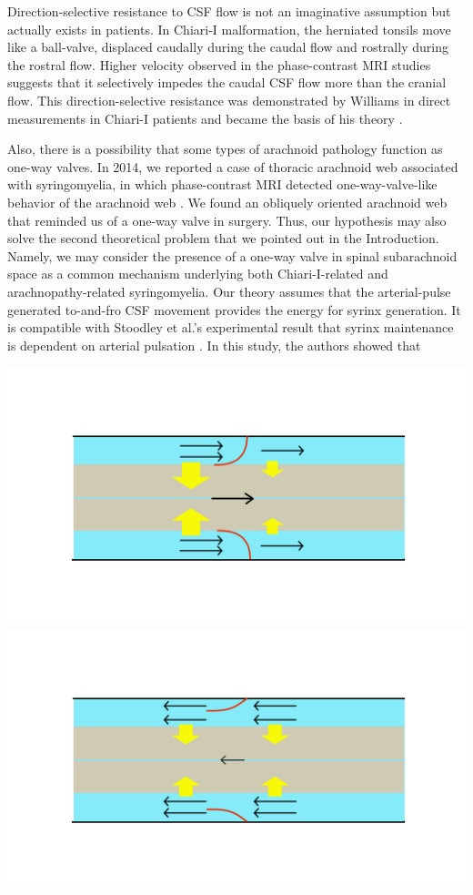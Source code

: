 \documentclass[fleqn,10pt]{wlscirep}
\begin{document}
Direction-selective resistance to CSF flow is not an imaginative assumption
but actually exists in patients. In Chiari-I malformation, the herniated
tonsils move like a ball-valve, displaced caudally during the caudal flow
and rostrally during the rostral flow. Higher velocity observed in the
phase-contrast MRI studies suggests that it selectively impedes the caudal
CSF flow more than the cranial flow. This direction-selective resistance
was demonstrated by Williams in direct measurements in Chiari-I patients
and became the basis of his theory \cite{williams1981simultaneous}.

Also, there is a possibility that some types of arachnoid pathology
function as one-way valves. In 2014, we reported a case of thoracic
arachnoid web associated with syringomyelia, in which phase-contrast MRI
detected one-way-valve-like behavior of the arachnoid web
\cite{chang2014dorsal}. We found an obliquely oriented arachnoid web that
reminded us of a one-way valve in surgery. Thus, our hypothesis may also
solve the second theoretical problem that we pointed out in the
Introduction. Namely, we may consider the presence of a one-way valve in
spinal subarachnoid space as a common mechanism underlying both
Chiari-I-related and arachnopathy-related syringomyelia.  Our theory
assumes that the arterial-pulse generated to-and-fro CSF movement provides
the energy for syrinx generation. It is compatible with Stoodley et al.'s
experimental result that syrinx maintenance is dependent on arterial
pulsation \cite{stoodley2000mechanisms}. In this study, the authors showed that

\begin{center}
\includegraphics[width=\textwidth]{pumping_mechanism_close.jpg}
\includegraphics[width=\textwidth]{pumping_mechanism_open.jpg}
\end{center}


\end{document}
